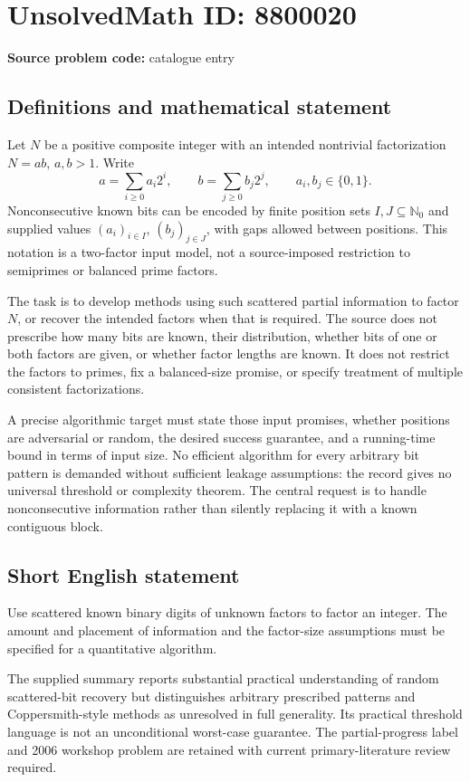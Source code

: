 \documentclass[11pt]{article}
\newcommand{\N}{\mathbb{N}}
\begin{document}
\section*{UnsolvedMath ID: 8800020}
\textbf{Source problem code:} catalogue entry
\subsection{Definitions and mathematical statement}
Let $N$ be a positive composite integer with an intended nontrivial factorization $N=ab$, $a,b>1$. Write
\[
 a=\sum_{i\ge0}a_i2^i,\qquad
 b=\sum_{j\ge0}b_j2^j,\qquad a_i,b_j\in\{0,1\}.
\]
Nonconsecutive known bits can be encoded by finite position sets $I,J\subseteq\N_0$ and supplied values $(a_i)_{i\in I}$, $(b_j)_{j\in J}$, with gaps allowed between positions. This notation is a two-factor input model, not a source-imposed restriction to semiprimes or balanced prime factors.

The task is to develop methods using such scattered partial information to factor $N$, or recover the intended factors when that is required. The source does not prescribe how many bits are known, their distribution, whether bits of one or both factors are given, or whether factor lengths are known. It does not restrict the factors to primes, fix a balanced-size promise, or specify treatment of multiple consistent factorizations.

A precise algorithmic target must state those input promises, whether positions are adversarial or random, the desired success guarantee, and a running-time bound in terms of input size. No efficient algorithm for every arbitrary bit pattern is demanded without sufficient leakage assumptions: the record gives no universal threshold or complexity theorem. The central request is to handle nonconsecutive information rather than silently replacing it with a known contiguous block.
\subsection{Short English statement}
Use scattered known binary digits of unknown factors to factor an integer. The amount and placement of information and the factor-size assumptions must be specified for a quantitative algorithm.

The supplied summary reports substantial practical understanding of random scattered-bit recovery but distinguishes arbitrary prescribed patterns and Coppersmith-style methods as unresolved in full generality. Its practical threshold language is not an unconditional worst-case guarantee. The partial-progress label and 2006 workshop problem are retained with current primary-literature review required.
\end{document}
